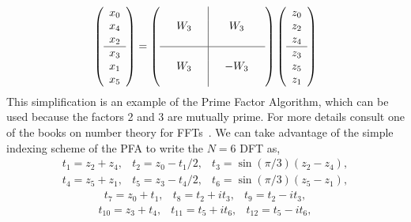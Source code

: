\documentclass[fleqn,12pt]{article}
\begin{document}
\begin{equation}
\left(
\begin{array}{c}
x_0 \\
x_4 \\
x_2 \\
\hline x_3 \\
x_1 \\
x_5
\end{array}
\right)
= 
\left(
\begin{array}{ccc|ccc}
  &   &  &  &   & \\
  &W_3&  &  &W_3& \\
  &   &  &  &   & \\
\hline  &   &  &  &   & \\
  &W_3&  &  &-W_3& \\
  &   &  &  &   & 
\end{array}
\right)
\left(
\begin{array}{c}
z_0 \\
z_2 \\
z_4 \\
\hline z_3 \\
z_5 \\
z_1 
\end{array}
\right)
\end{equation}
%
This simplification is an example of the Prime Factor Algorithm, which
can be used because the factors 2 and 3 are mutually prime.  For more
details consult one of the books on number theory for
FFTs~\cite{elliott82,blahut}. We can take advantage of the simple
indexing scheme of the PFA to write the $N=6$ DFT as,
%
\begin{equation}
\begin{array}{lll}
t_1 = z_2 + z_4, &
t_2 = z_0 - t_1/2, &
t_3 = \sin(\pi/3) (z_2 - z_4),
\end{array}
\end{equation}
\begin{equation}
\begin{array}{lll}
t_4 = z_5 + z_1, &
t_5 = z_3 - t_4/2, &
t_6 = \sin(\pi/3) (z_5 - z_1), 
\end{array}
\end{equation}
\begin{equation}
\begin{array}{lll}
t_7 = z_0 + t_1, &
t_8 = t_2 + i t_3, &
t_9 = t_2 - i t_3,
\end{array}
\end{equation}
\begin{equation}
\begin{array}{lll}
t_{10} = z_3 + t_4, &
t_{11} = t_5 + i t_6, &
t_{12} = t_5 - i t_6, 
\end{array}
\end{equation}
\end{document}

